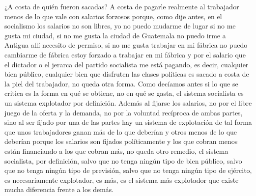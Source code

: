 ¿A costa de quién fueron sacadas? A costa de pagarle realmente al trabajador menos de lo que vale con salarios forzosos porque, como dije antes, en el socialismo los salarios no son libres, yo no puedo mudarme de lugar si no me gusta mi ciudad, si no me gusta la ciudad de Guatemala no puedo irme a Antigua allí necesito de permiso, si no me gusta trabajar en mi fábrica no puedo cambiarme de fábrica estoy forzado a trabajar en mi fábrica y por el salario que el dictador o el jerarca del partido socialista me está pagando, es decir, cualquier bien público, cualquier bien que disfruten las clases políticas es sacado a costa de la piel del trabajador, no queda otra forma. Como decíamos antes si lo que se critica es la forma en qué se obtiene, no en qué se gasta, el sistema socialista es un sistema explotador por definición. Además al fijarse los salarios, no por el libre juego de la oferta y la demanda, no por la voluntad recíproca de ambas partes, sino al ser fijado por una de las partes hay un sistema de explotación de tal forma que unos trabajadores ganan más de lo que deberían y otros menos de lo que deberían porque los salarios son fijados políticamente y los que cobran menos están financiando a los que cobran más, no queda otro remedio, el sistema socialista, por definición, salvo que no tenga ningún tipo de bien público, salvo que no tenga ningún tipo de previsión, salvo que no tenga ningún tipo de ejército, es necesariamente explotador, es más, es el sistema más explotador que existe mucha diferencia frente a los demás.

